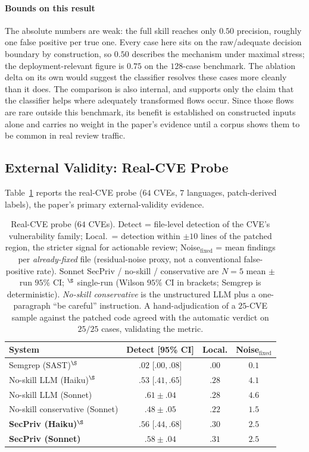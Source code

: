\documentclass[runningheads]{llncs}
\begin{document}
\paragraph{Bounds on this result} The absolute numbers are weak: the full skill reaches only $0.50$ precision, roughly one false positive per true one. Every case here sits on the raw/adequate decision boundary by construction, so $0.50$ describes the mechanism under maximal stress; the deployment-relevant figure is $0.75$ on the $128$-case benchmark. The ablation delta on its own would suggest the classifier resolves these cases more cleanly than it does. The comparison is also internal, and supports only the claim that the classifier helps where adequately transformed flows occur. Since those flows are rare outside this benchmark, its benefit is established on constructed inputs alone and carries no weight in the paper's evidence until a corpus shows them to be common in real review traffic.

\subsection{External Validity: Real-CVE Probe}\label{sec:cveprobe}

Table~\ref{tab:cve} reports the real-CVE probe ($64$ CVEs, $7$ languages, patch-derived labels), the paper's primary external-validity evidence.

\begin{table}[htbp]
\centering
\footnotesize
\setlength{\tabcolsep}{3pt}
\begin{tabular}{lccc}
\toprule
\textbf{System} & \textbf{Detect [95\% CI]} & \textbf{Local.} & \textbf{Noise$_{\text{fixed}}$} \\
\midrule
Semgrep (SAST)$^\S$          & $.02$ [$.00,.08$] & $.00$ & $0.1$ \\
No-skill LLM (Haiku)$^\S$    & $.53$ [$.41,.65$] & $.28$ & $4.1$ \\
No-skill LLM (Sonnet)   & $.61{\pm}.04$ & $.28$ & $4.6$ \\
No-skill conservative (Sonnet) & $.48{\pm}.05$ & $.22$ & $1.5$ \\
\textbf{SecPriv (Haiku)}$^\S$  & $.56$ [$.44,.68$] & $.30$ & $2.5$ \\
\textbf{SecPriv (Sonnet)} & $.58{\pm}.04$ & $.31$ & $\mathbf{2.5}$ \\
\bottomrule
\end{tabular}
\caption{Real-CVE probe ($64$ CVEs). Detect = file-level detection of the CVE's vulnerability family; Local.\ = detection within $\pm 10$ lines of the patched region, the stricter signal for actionable review; Noise$_{\text{fixed}}$ = mean findings per \emph{already-fixed} file (residual-noise proxy, not a conventional false-positive rate). Sonnet SecPriv / no-skill / conservative are $N{=}5$ mean $\pm$ run $95\%$ CI; $^\S$ single-run (Wilson $95\%$ CI in brackets; Semgrep is deterministic). \emph{No-skill conservative} is the unstructured LLM plus a one-paragraph ``be careful'' instruction. A hand-adjudication of a $25$-CVE sample against the patched code agreed with the automatic verdict on $25/25$ cases, validating the metric.}
\label{tab:cve}
\end{table}
\end{document}
